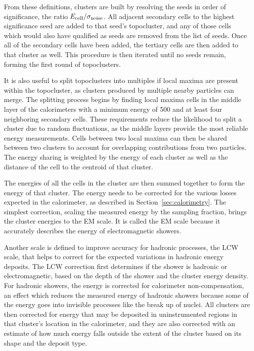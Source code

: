From these definitions, clusters are built by resolving the seeds in order of significance, the ratio $E_{\mathrm{cell}}/\sigma_{\mathrm{noise}}$.
All adjacent secondary cells to the highest significance seed are added to that seed's topocluster, and any of those cells which would also have qualified as seeds are removed from the list of seeds.
Once all of the secondary cells have been added, the tertiary cells are then added to that cluster as well.
This procedure is then iterated until no seeds remain, forming the first round of topoclusters.

It is also useful to split topoclusters into multiples if local maxima are present within the topocluster, as clusters produced by multiple nearby particles can merge.
The splitting process begins by finding local maxima cells in the middle layer of the calorimeters with a minimum energy of 500 \MeV and at least four neighboring secondary cells.
These requirements reduce the likelihood to split a cluster due to random fluctuations, as the middle layers provide the most reliable energy measurements.
Cells between two local maxima can then be shared between two clusters to account for overlapping contributions from two particles. The energy sharing is weighted by the energy of each cluster as well as the distance of the cell to the centroid of that cluster.

The energies of all the cells in the cluster are then summed together to form the energy of that cluster.
The energy needs to be corrected for the various losses expected in the calorimeter, as described in Section~\ref{sec:calorimetry}.
The simplest correction, scaling the measured energy by the sampling fraction, brings the cluster energies to the \ac{EM} scale.
It is called the \ac{EM} scale because it accurately describes the energy of electromagnetic showers.

Another scale is defined to improve accuracy for hadronic processes, the \ac{LCW} scale, that helps to correct for the expected variations in hadronic energy deposits.
The \ac{LCW} correction first determines if the shower is hadronic or electromagnetic, based on the depth of the shower and the cluster energy density.
For hadronic showers, the energy is corrected for calorimeter non-compensation, an effect which reduces the measured energy of hadronic showers because some of the energy goes into invisible processes like the break up of nuclei.
All clusters are then corrected for energy that may be deposited in uninstrumented regions in that cluster's location in the calorimeter, and they are also corrected with an estimate of how much energy falls outside the extent of the cluster based on its shape and the deposit type.

